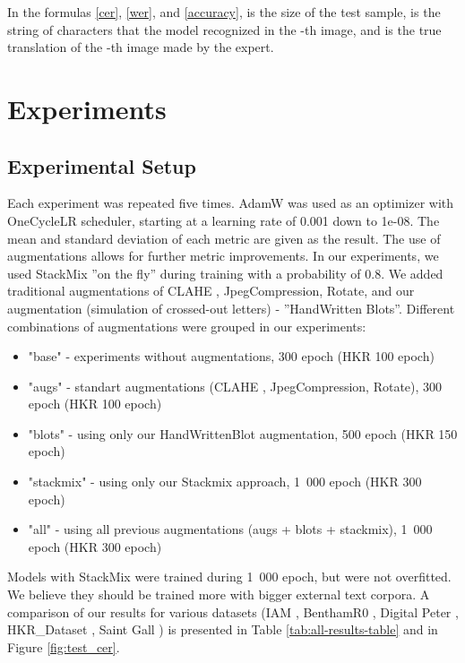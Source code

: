 \documentclass[10pt,twocolumn,letterpaper]{article}
\begin{document}
In the formulas \eqref{cer}, \eqref{wer}, and \eqref{accuracy},  is the size of the test sample,  is the string of characters that the model recognized in the -th image, and  is the true translation of the -th image made by the expert.

\section{Experiments}


\subsection{Experimental Setup}

Each experiment was repeated five times. AdamW was used as an optimizer \cite{adamW} with OneCycleLR scheduler, starting at a learning rate of 0.001 down to 1e-08. The mean and standard deviation of each metric are given as the result. The use of augmentations allows for further metric improvements. In our experiments, we used StackMix ”on the fly” during training with a probability of 0.8. We added traditional augmentations of CLAHE \cite{Reza2004}, JpegCompression, Rotate, and our augmentation (simulation of crossed-out letters) - ”HandWritten Blots”. Different combinations of augmentations were grouped in our experiments:

\begin{itemize}
    \item "base" - experiments without augmentations, 300 epoch (HKR 100 epoch)
    \item "augs" - standart augmentations (CLAHE \cite{Reza2004}, JpegCompression, Rotate), 300 epoch (HKR 100 epoch)
    \item "blots" - using only our HandWrittenBlot augmentation, 500 epoch (HKR 150 epoch)
    \item "stackmix" - using only our Stackmix approach, 1~000 epoch (HKR 300 epoch)
    \item "all" - using all previous augmentations (augs + blots + stackmix), 1~000 epoch (HKR 300 epoch)
\end{itemize}

 Models with StackMix were trained during 1~000 epoch, but were not overfitted. We believe they should be trained more with bigger external text corpora. A comparison of our results for various datasets (IAM \cite{marti2002iam}, BenthamR0 \cite{bentham}, Digital Peter \cite{potanin2021digital}, HKR\_Dataset \cite{nurseitov2020hkr}, Saint Gall \cite{fischer2011transcription}) is presented in Table \ref{tab:all-results-table} and in Figure \ref{fig:test_cer}. 
\end{document}

